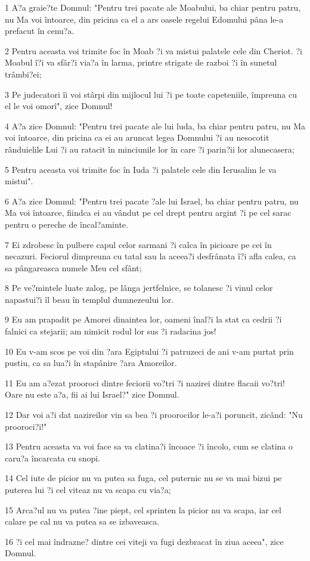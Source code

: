 \par 1 A?a graie?te Domnul: "Pentru trei pacate ale Moabului, ba chiar pentru patru, nu Ma voi întoarce, din pricina ca el a ars oasele regelui Edomului pâna le-a prefacut în cenu?a.
\par 2 Pentru aceasta voi trimite foc în Moab ?i va mistui palatele cele din Cheriot. ?i Moabul î?i va sfâr?i via?a în larma, printre strigate de razboi ?i în sunetul trâmbi?ei;
\par 3 Pe judecatori îi voi stârpi din mijlocul lui ?i pe toate capeteniile, împreuna cu el le voi omorî", zice Domnul!
\par 4 A?a zice Domnul: "Pentru trei pacate ale lui luda, ba chiar pentru patru, nu Ma voi întoarce, din pricina ca ei au aruncat legea Domnului ?i au nesocotit rânduielile Lui ?i au ratacit în minciunile lor în care ?i parin?ii lor alunecasera;
\par 5 Pentru aceasta voi trimite foc în Iuda ?i palatele cele din Ierusalim le va mistui".
\par 6 A?a zice Domnul: "Pentru trei pacate ?ale lui Israel, ba chiar pentru patru, nu Ma voi întoarce, fiindca ei au vândut pe cel drept pentru argint ?i pe cel sarac pentru o pereche de încal?aminte.
\par 7 Ei zdrobesc în pulbere capul celor sarmani ?i calca în picioare pe cei în necazuri. Feciorul dimpreuna cu tatal sau la aceea?i desfrânata î?i afla calea, ca sa pângareasca numele Meu cel sfânt;
\par 8 Pe ve?mintele luate zalog, pe lânga jertfelnice, se tolanesc ?i vinul celor napastui?i îl beau în templul dumnezeului lor.
\par 9 Eu am prapadit pe Amorei dinaintea lor, oameni înal?i la stat ca cedrii ?i falnici ca stejarii; am nimicit rodul lor sus ?i radacina jos!
\par 10 Eu v-am scos pe voi din ?ara Egiptului ?i patruzeci de ani v-am purtat prin pustiu, ca sa lua?i în stapânire ?ara Amoreilor.
\par 11 Eu am a?ezat prooroci dintre feciorii vo?tri ?i nazirei dintre flacaii vo?tri! Oare nu este a?a, fii ai lui Israel?" zice Domnul.
\par 12 Dar voi a?i dat nazireilor vin sa bea ?i proorocilor le-a?i poruncit, zicând: "Nu prooroci?i!"
\par 13 Pentru aceasta va voi face sa va clatina?i încoace ?i încolo, cum se clatina o caru?a încarcata cu snopi.
\par 14 Cel iute de picior nu va putea sa fuga, cel puternic nu se va mai bizui pe puterea lui ?i cel viteaz nu va scapa cu via?a;
\par 15 Arca?ul nu va putea ?ine piept, cel sprinten la picior nu va scapa, iar cel calare pe cal nu va putea sa se izbaveasca.
\par 16 ?i cel mai îndrazne? dintre cei viteji va fugi dezbracat în ziua aceea", zice Domnul.

